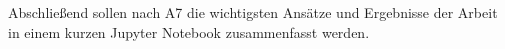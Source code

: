 \begin{otherlanguage}{ngerman}





\section{}

Abschließend sollen nach A7 die wichtigsten Ansätze und Ergebnisse der Arbeit in einem kurzen Jupyter Notebook zusammenfasst werden. 


\end{otherlanguage}
